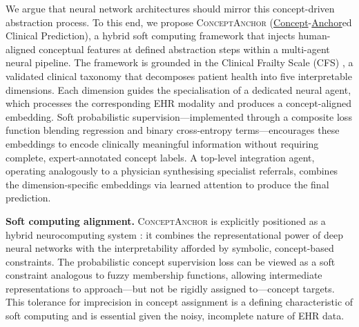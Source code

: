 \documentclass[review,12pt,authoryear]{elsarticle}
\newcommand{\modelname}{\textsc{ConceptAnchor}}
\begin{document}
We argue that neural network architectures should mirror this concept-driven abstraction process.
To this end, we propose \modelname{} (\underline{Concept}-\underline{Anchor}ed Clinical Prediction), a hybrid soft computing framework that injects human-aligned conceptual features at defined abstraction steps within a multi-agent neural pipeline.
The framework is grounded in the Clinical Frailty Scale (CFS) \citep{rockwood2005frailty}, a validated clinical taxonomy that decomposes patient health into five interpretable dimensions.
Each dimension guides the specialisation of a dedicated neural agent, which processes the corresponding EHR modality and produces a concept-aligned embedding.
Soft probabilistic supervision—implemented through a composite loss function blending regression and binary cross-entropy terms—encourages these embeddings to encode clinically meaningful information without requiring complete, expert-annotated concept labels.
A top-level integration agent, operating analogously to a physician synthesising specialist referrals, combines the dimension-specific embeddings via learned attention to produce the final prediction.

\textbf{Soft computing alignment.}
\modelname{} is explicitly positioned as a hybrid neurocomputing system \citep{abraham2005hybrid}: it combines the representational power of deep neural networks with the interpretability afforded by symbolic, concept-based constraints.
The probabilistic concept supervision loss can be viewed as a soft constraint analogous to fuzzy membership functions, allowing intermediate representations to approach—but not be rigidly assigned to—concept targets.
This tolerance for imprecision in concept assignment is a defining characteristic of soft computing and is essential given the noisy, incomplete nature of EHR data.
\end{document}
